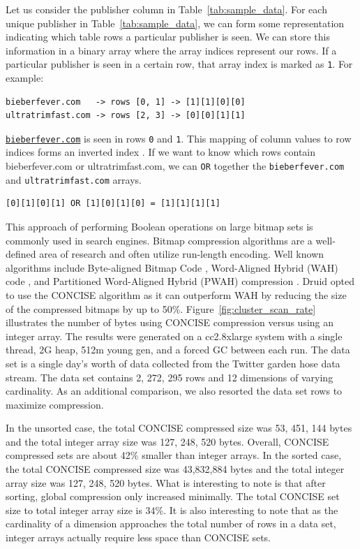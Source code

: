 \documentclass{vldb}
\begin{document}
Let us consider the publisher column in
Table~\ref{tab:sample_data}. For each unique publisher in
Table~\ref{tab:sample_data}, we can form some representation
indicating which table rows a particular publisher is seen. We can
store this information in a binary array where the array indices
represent our rows. If a particular publisher is seen in a certain
row, that array index is marked as \texttt{1}. For example:
\begin{verbatim}
bieberfever.com   -> rows [0, 1] -> [1][1][0][0]
ultratrimfast.com -> rows [2, 3] -> [0][0][1][1]
\end{verbatim}

\texttt{\href{http://bieberfever.com}{bieberfever.com}} is seen in rows \texttt{0} and \texttt{1}. This mapping of column values
to row indices forms an inverted index \cite{tomasic1993performance}. If we want to know which
rows contain {\ttfamily bieberfever.com} or {\ttfamily ultratrimfast.com}, we can \texttt{OR} together
the \texttt{bieberfever.com} and \texttt{ultratrimfast.com} arrays.
\begin{verbatim}
[0][1][0][1] OR [1][0][1][0] = [1][1][1][1]
\end{verbatim}

This approach of performing Boolean operations on large bitmap sets is
commonly used in search engines. Bitmap compression algorithms are a
well-defined area of research and often utilize run-length
encoding. Well known algorithms include Byte-aligned Bitmap Code \cite{antoshenkov1995byte},
Word-Aligned Hybrid (WAH) code \cite{wu2006optimizing}, and Partitioned Word-Aligned
Hybrid (PWAH) compression \cite{van2011memory}. Druid opted to use the CONCISE
algorithm \cite{colantonio2010concise} as it can outperform WAH by reducing the size of the
compressed bitmaps by up to 50\%.  Figure~\ref{fig:cluster_scan_rate} illustrates the number of
bytes using CONCISE compression versus using an integer array. The
results were generated on a cc2.8xlarge system with a single thread,
2G heap, 512m young gen, and a forced GC between each run. The data
set is a single day’s worth of data collected from the Twitter garden
hose \cite{twitter2013} data stream. The data set contains 2, 272, 295 rows and 12
dimensions of varying cardinality. As an additional comparison, we
also resorted the data set rows to maximize compression.

In the unsorted case, the total CONCISE compressed size was 53, 451,
144 bytes and the total integer array size was 127, 248, 520
bytes. Overall, CONCISE compressed sets are about 42\% smaller
than integer arrays.  In the sorted case, the total CONCISE compressed
size was 43,832,884 bytes and the total integer array size was 127,
248, 520 bytes. What is interesting to note is that after sorting,
global compression only increased minimally. The total CONCISE set
size to total integer array size is 34\%. It is also
interesting to note that as the cardinality of a dimension approaches
the total number of rows in a data set, integer arrays actually
require less space than CONCISE sets.
\end{document}
